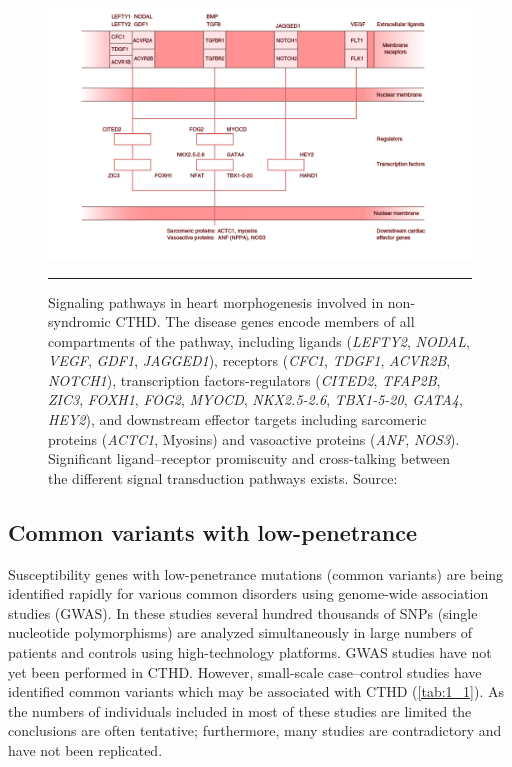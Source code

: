 \begin{refsection}
\begin{figure}
\centering
\includegraphics[scale=0.75,keepaspectratio]{Figures/Figure1_5.pdf}
\rule{35em}{0.5pt}
\caption{Signaling pathways in heart morphogenesis involved in non-syndromic CTHD. The disease genes encode members of all compartments of the pathway, including ligands (\textit{LEFTY2}, \textit{NODAL}, \textit{VEGF}, \textit{GDF1}, \textit{JAGGED1}), receptors (\textit{CFC1}, \textit{TDGF1}, \textit{ACVR2B}, \textit{NOTCH1}), transcription factors-regulators (\textit{CITED2}, \textit{TFAP2B}, \textit{ZIC3}, \textit{FOXH1}, \textit{FOG2}, \textit{MYOCD}, \textit{NKX2.5-2.6}, \textit{TBX1-5-20}, \textit{GATA4}, \textit{HEY2}), and downstream effector targets including sarcomeric proteins (\textit{ACTC1}, Myosins) and vasoactive proteins (\textit{ANF}, \textit{NOS3}). Significant ligand–receptor promiscuity and cross-talking between the different signal transduction pathways exists. Source: \cite{wessels2010genetic}}
\label{fig:1_5}
\end{figure}

\subsection{Common variants with low-penetrance}

\begin{sloppypar} Susceptibility genes with low-penetrance mutations (common variants) are being identified rapidly for various common disorders using genome-wide association studies (GWAS). In these studies several hundred thousands of SNPs (single nucleotide polymorphisms) are analyzed simultaneously in large numbers of patients and controls using high-technology platforms. GWAS studies have not yet been performed in CTHD. However, small-scale case–control studies have identified common variants which may be associated with CTHD (\cref{tab:1_1}). As the numbers of individuals included in most of these studies are limited the conclusions are often tentative; furthermore, many studies are contradictory and have not been replicated. \end{sloppypar}


\end{refsection}
